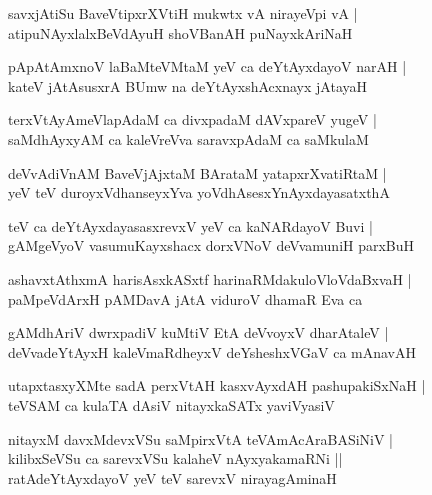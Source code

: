 \documentclass[twoside,12pt,openright]{book}
\newcounter{shloka}[chapter]
\begin{document}
\begin{shloka}%
savxjAtiSu BaveVtipxrXVtiH mukwtx vA nirayeVpi vA |\\
atipuNAyxlalxBeVdAyuH shoVBanAH puNayxkAriNaH 
\end{shloka}

\begin{shloka}%
pApAtAmxnoV laBaMteVMtaM yeV ca deYtAyxdayoV narAH |\\
kateV jAtAsusxrA BUmw na deYtAyxshAcxnayx jAtayaH 
\end{shloka}

\begin{shloka}%
terxVtAyAmeVlapAdaM ca divxpadaM dAVxpareV yugeV |\\
saMdhAyxyAM ca kaleVreVva saravxpAdaM ca saMkulaM 
\end{shloka}

\begin{shloka}%
deVvAdiVnAM BaveVjAjxtaM BArataM yatapxrXvatiRtaM |\\
yeV teV duroyxVdhanseyxYva yoVdhAsesxYnAyxdayasatxthA
\end{shloka}

\begin{shloka}%
teV ca deYtAyxdayasasxrevxV yeV ca kaNARdayoV Buvi |\\
gAMgeVyoV vasumuKayxshacx dorxVNoV deVvamuniH parxBuH 
\end{shloka}

\begin{shloka}%
ashavxtAthxmA harisAsxkASxtf harinaRMdakuloVloVdaBxvaH |\\
paMpeVdArxH pAMDavA jAtA viduroV dhamaR Eva ca 
\end{shloka}

\begin{shloka}%
gAMdhAriV dwrxpadiV kuMtiV EtA deVvoyxV dharAtaleV |\\
deVvadeYtAyxH kaleVmaRdheyxV deYsheshxVGaV ca mAnavAH 
\end{shloka}

\begin{shloka}%
utapxtasxyXMte sadA perxVtAH kasxvAyxdAH pashupakiSxNaH |\\
teVSAM ca kulaTA dAsiV nitayxkaSATx yaviVyasiV 
\end{shloka}

\begin{shloka}%
nitayxM davxMdevxVSu saMpirxVtA teVAmAcAraBASiNiV |\\
kilibxSeVSu ca sarevxVSu kalaheV nAyxyakamaRNi ||\\
ratAdeYtAyxdayoV yeV teV sarevxV nirayagAminaH 
\end{shloka}
\end{document}
